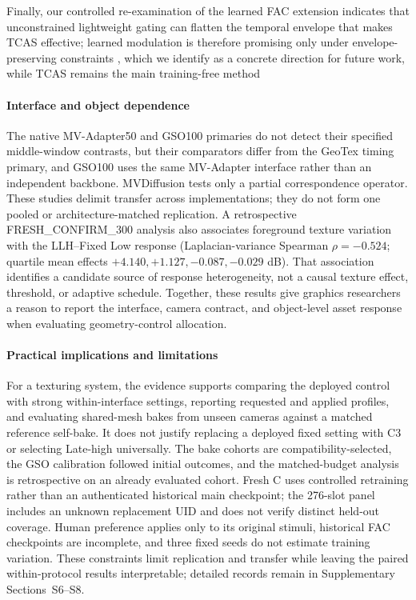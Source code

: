 \documentclass[times,twocolumn,final]{elsarticle}
\providecommand{\DIFadd}[1]{{\protect\color{blue} \sf #1}} %
\providecommand{\DIFdel}[1]{{\protect\color{red} \scriptsize #1}} %
\providecommand{\DIFaddbegin}{} %
\providecommand{\DIFaddend}{} %
\providecommand{\DIFdelbegin}{} %
\providecommand{\DIFdelend}{} %
\begin{document}
\DIFdelbegin \DIFdel{Finally, our controlled re-examination of the learned FAC extension indicates that unconstrained lightweight gating can flatten the temporal envelope that makes TCAS effective; learned modulation is therefore promising only under envelope-preserving constraints , which we identify as a concrete direction for future work, while TCAS remains the main training-free method}\DIFdelend \DIFaddbegin \paragraph{Interface and object dependence}
\DIFadd{The native MV-Adapter50 and GSO100 primaries do not detect their specified middle-window contrasts, but their comparators differ from the GeoTex timing primary, and GSO100 uses the same MV-Adapter interface rather than an independent backbone. MVDiffusion tests only a partial correspondence operator. These studies delimit transfer across implementations; they do not form one pooled or architecture-matched replication. A retrospective FRESH\_CONFIRM\_300 analysis also associates foreground texture variation with the LLH--Fixed Low response (Laplacian-variance Spearman $\rho=-0.524$; quartile mean effects $+4.140,+1.127,-0.087,-0.029$ dB). That association identifies a candidate source of response heterogeneity, not a causal texture effect, threshold, or adaptive schedule. Together, these results give graphics researchers a reason to report the interface, camera contract, and object-level asset response when evaluating geometry-control allocation.
}

\paragraph{Practical implications and limitations}
\DIFadd{For a texturing system, the evidence supports comparing the deployed control with strong within-interface settings, reporting requested and applied profiles, and evaluating shared-mesh bakes from unseen cameras against a matched reference self-bake. It does not justify replacing a deployed fixed setting with C3 or selecting Late-high universally. The bake cohorts are compatibility-selected, the GSO calibration followed initial outcomes, and the matched-budget analysis is retrospective on an already evaluated cohort. Fresh C uses controlled retraining rather than an authenticated historical main checkpoint; the 276-slot panel includes an unknown replacement UID and does not verify distinct held-out coverage. Human preference applies only to its original stimuli, historical FAC checkpoints are incomplete, and three fixed seeds do not estimate training variation. These constraints limit replication and transfer while leaving the paired within-protocol results interpretable; detailed records remain in Supplementary Sections~S6--S8}\DIFaddend .
\end{document}
